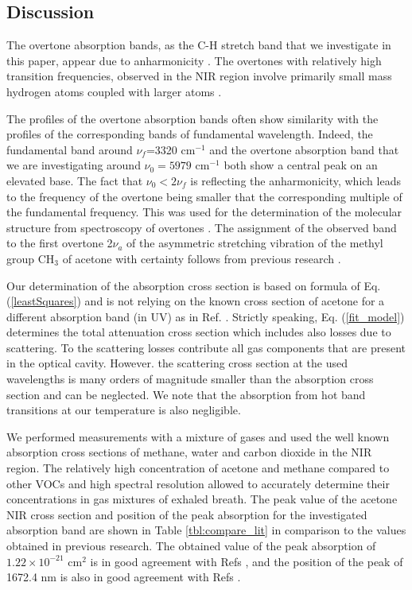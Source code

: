 \documentclass[12pt]{report}
\begin{document}
	\subsection{Discussion}
	The overtone absorption bands, as the C-H stretch band that we investigate in this paper, appear due to anharmonicity \cite{Sandorfy_1978}. The overtones with relatively high transition frequencies, observed in the NIR region involve primarily small mass hydrogen atoms coupled with larger atoms \cite{Weyer_2006}.
	
	The profiles of the overtone absorption bands often show similarity with the profiles of the corresponding bands of fundamental wavelength. Indeed, the fundamental band \cite{Harrison_2011_3um} around $\nu_f$=3320 cm$^{-1}$ and the overtone absorption band that we are investigating around $\nu_0=5979$ cm$^{-1}$ both show a central peak on an elevated base. The fact that $\nu_0 < 2\nu_f$ is reflecting the  anharmonicity, which leads to the frequency of the overtone being smaller that the corresponding multiple of the fundamental frequency. This was used for the determination of the molecular structure from spectroscopy of overtones \cite{Henry_1987}. The assignment of the observed band to the first overtone 2$\nu_a$ of the asymmetric stretching vibration of the methyl group CH$_3$ of acetone with certainty follows from previous research \cite{Pearle_2008, Wang_2004, Hanazaki_1985}.
	
	Our determination of the absorption cross section is based on formula of Eq. (\ref{leastSquares}) and is not relying on the known cross section of acetone for a different absorption band (in UV) as in Ref. \cite{Pawel_2007}. Strictly speaking, Eq. (\ref{fit_model}) determines the total attenuation cross section which includes also losses due to scattering. To the scattering losses contribute all gas components that are present in the optical cavity. However. the scattering cross section at the used wavelengths is many orders of magnitude smaller than the absorption cross section \cite{Penndorf_1957} and can be neglected. We note that the absorption from hot band transitions \cite{Levine_2014_quantum_chem} at our temperature is also negligible.
	
	We performed measurements with a mixture of gases and used the well known absorption cross sections of methane, water and carbon dioxide in the NIR region. The relatively high concentration of acetone and methane compared to other VOCs and high spectral resolution allowed to accurately determine their concentrations in gas mixtures of exhaled breath. The peak value of the acetone NIR cross section and position of the peak absorption for the investigated absorption band are shown in Table \ref{tbl:compare_lit} in comparison to the values obtained in previous research.
	The obtained value of the peak absorption of $1.22\times10^{-21}\text{ cm}^2$ is in good agreement with Refs \cite{Pearle_2008, Wang_2004, Denzer_2010}, and the position of the peak of 1672.4 nm is also in good agreement with Refs \cite{pnnl_database_gas_phase,Pearle_2008}.
	
\end{document}
